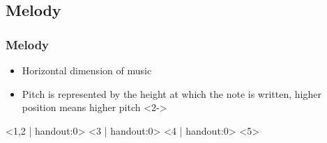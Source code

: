 \documentclass[english,handout]{beamer}
\begin{document}
\subsection{Melody}
	\begin{frame}
		\frametitle{Melody}
		\begin{itemize}
			\item \alert{Horizontal} dimension of music
			\item \alert{Pitch} is represented by the \alert{height} at which the note is written, higher position means higher pitch
			<2->
		\end{itemize}
		\begin{center}
			<1,2 | handout:0>
			<3 | handout:0>
			<4 | handout:0>
			<5>
			\vfill
			\href{file:///home/trigork/presentation/midi/intro_scale.mp3}{}
		\end{center}
	\end{frame}
\end{document}
